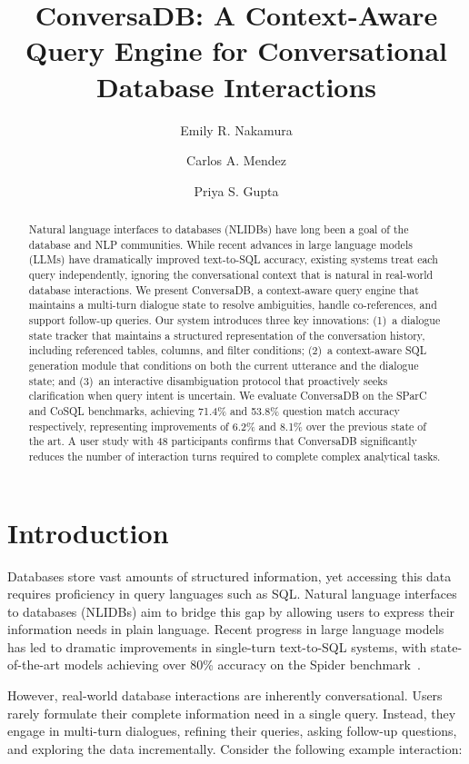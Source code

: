 \documentclass[sigconf,nonacm]{acmart}
\title{ConversaDB: A Context-Aware Query Engine for Conversational Database Interactions}
\author{Emily R. Nakamura}
\affiliation{
  \institution{University of Washington}
  \department{Paul G. Allen School of Computer Science}
  \city{Seattle}
  \state{WA}
  \country{USA}
}
\author{Carlos A. Mendez}
\affiliation{
  \institution{ETH Zurich}
  \department{Department of Computer Science}
  \city{Zurich}
  \country{Switzerland}
}
\author{Priya S. Gupta}
\affiliation{
  \institution{Microsoft Research}
  \city{Redmond}
  \state{WA}
  \country{USA}
}
\begin{document}
\begin{abstract}
Natural language interfaces to databases (NLIDBs) have long been a goal of the database and NLP communities. While recent advances in large language models (LLMs) have dramatically improved text-to-SQL accuracy, existing systems treat each query independently, ignoring the conversational context that is natural in real-world database interactions. We present ConversaDB, a context-aware query engine that maintains a multi-turn dialogue state to resolve ambiguities, handle co-references, and support follow-up queries. Our system introduces three key innovations: (1)~a dialogue state tracker that maintains a structured representation of the conversation history, including referenced tables, columns, and filter conditions; (2)~a context-aware SQL generation module that conditions on both the current utterance and the dialogue state; and (3)~an interactive disambiguation protocol that proactively seeks clarification when query intent is uncertain. We evaluate ConversaDB on the SParC and CoSQL benchmarks, achieving 71.4\% and 53.8\% question match accuracy respectively, representing improvements of 6.2\% and 8.1\% over the previous state of the art. A user study with 48 participants confirms that ConversaDB significantly reduces the number of interaction turns required to complete complex analytical tasks.
\end{abstract}


\maketitle

\section{Introduction}

Databases store vast amounts of structured information, yet accessing this data requires proficiency in query languages such as SQL. Natural language interfaces to databases (NLIDBs) aim to bridge this gap by allowing users to express their information needs in plain language. Recent progress in large language models has led to dramatic improvements in single-turn text-to-SQL systems, with state-of-the-art models achieving over 80\% accuracy on the Spider benchmark~\cite{yu2018spider}.

However, real-world database interactions are inherently conversational. Users rarely formulate their complete information need in a single query. Instead, they engage in multi-turn dialogues, refining their queries, asking follow-up questions, and exploring the data incrementally. Consider the following example interaction:
\end{document}
